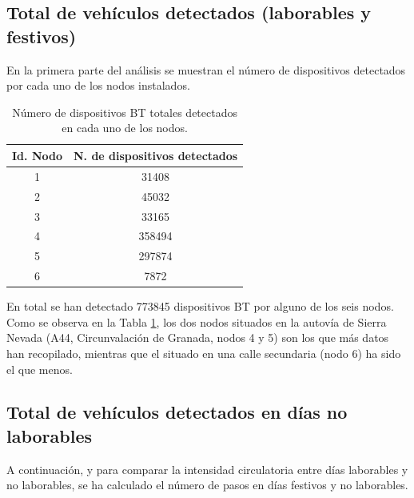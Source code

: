 \documentclass[twocolumn,twoside]{Jornadas}
\begin{document}
\subsection{Total de vehículos detectados (laborables y festivos)}

En la primera parte del análisis se muestran el número de dispositivos detectados por cada uno de los nodos instalados.

 \begin{table}
 \caption{Número de dispositivos BT totales detectados en cada uno de los nodos.
 \label{VehiculosTotales}}
 \begin{center}
 \begin{tabular}{|c|c|}
 \hline
Id. Nodo  &  N. de dispositivos detectados  \\
 \hline
    1     &    31408  \\
 \hline
    2     &    45032  \\
 \hline
    3     &    33165  \\
 \hline
    4     &    358494  \\
 \hline
    5     &    297874  \\
 \hline
    6     &    7872  \\
 \hline
 \end{tabular}
 \end{center}
 \end{table}

En total se han detectado 773845 dispositivos BT por alguno de los seis nodos. 
Como se observa en la Tabla \ref{VehiculosTotales}, los dos nodos situados en la autovía de Sierra Nevada 
(A44, Circunvalación de Granada, nodos 4 y 5) son los que más datos han recopilado, mientras que el situado en una calle 
secundaria (nodo 6) ha sido el que menos.


\subsection{Total de vehículos detectados en días no laborables}

A continuación, y para comparar la intensidad circulatoria entre días laborables y no laborables, se ha calculado el número de pasos en días festivos y no laborables.
\end{document}
